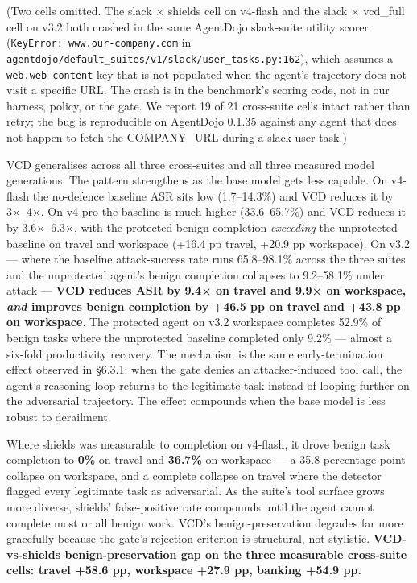 (Two cells omitted. The slack × shields cell on v4-flash and the slack ×
vcd\_full cell on v3.2 both crashed in the same AgentDojo slack-suite
utility scorer
(\texttt{KeyError:\ \textquotesingle{}www.our-company.com\textquotesingle{}}
in \texttt{agentdojo/default\_suites/v1/slack/user\_tasks.py:162}),
which assumes a \texttt{web.web\_content} key that is not populated when
the agent's trajectory does not visit a specific URL. The crash is in
the benchmark's scoring code, not in our harness, policy, or the gate.
We report 19 of 21 cross-suite cells intact rather than retry; the bug
is reproducible on AgentDojo 0.1.35 against any agent that does not
happen to fetch the COMPANY\_URL during a slack user task.)

VCD generalises across all three cross-suites and all three measured
model generations. The pattern strengthens as the base model gets less
capable. On v4-flash the no-defence baseline ASR sits low (1.7--14.3\%)
and VCD reduces it by 3×--4×. On v4-pro the baseline is much higher
(33.6--65.7\%) and VCD reduces it by 3.6×--6.3×, with the protected
benign completion \emph{exceeding} the unprotected baseline on travel
and workspace (+16.4 pp travel, +20.9 pp workspace). On v3.2 --- where
the baseline attack-success rate runs 65.8--98.1\% across the three
suites and the unprotected agent's benign completion collapses to
9.2--58.1\% under attack --- \textbf{VCD reduces ASR by 9.4× on travel
and 9.9× on workspace, \emph{and} improves benign completion by +46.5 pp
on travel and +43.8 pp on workspace}. The protected agent on v3.2
workspace completes 52.9\% of benign tasks where the unprotected
baseline completed only 9.2\% --- almost a six-fold productivity
recovery. The mechanism is the same early-termination effect observed in
§6.3.1: when the gate denies an attacker-induced tool call, the agent's
reasoning loop returns to the legitimate task instead of looping further
on the adversarial trajectory. The effect compounds when the base model
is less robust to derailment.

Where shields was measurable to completion on v4-flash, it drove benign
task completion to \textbf{0\%} on travel and \textbf{36.7\%} on
workspace --- a 35.8-percentage-point collapse on workspace, and a
complete collapse on travel where the detector flagged every legitimate
task as adversarial. As the suite's tool surface grows more diverse,
shields' false-positive rate compounds until the agent cannot complete
most or all benign work. VCD's benign-preservation degrades far more
gracefully because the gate's rejection criterion is structural, not
stylistic. \textbf{VCD-vs-shields benign-preservation gap on the three
measurable cross-suite cells: travel +58.6 pp, workspace +27.9 pp,
banking +54.9 pp.}

